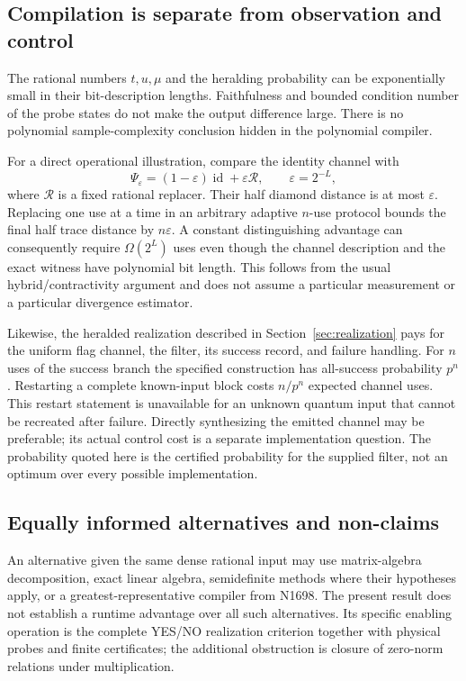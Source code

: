 \documentclass[11pt,a4paper]{article}
\theoremstyle{definition}\newtheorem{definition}[theorem]{Definition}
\newcommand{\id}{\operatorname{id}}
\begin{document}
\subsection{Compilation is separate from observation and control}

The rational numbers $t,u,\mu$ and the heralding probability can be exponentially small in their bit-description lengths. Faithfulness and bounded condition number of the probe states do not make the output difference large. There is no polynomial sample-complexity conclusion hidden in the polynomial compiler.

For a direct operational illustration, compare the identity channel with
\[
 \Psi_\varepsilon=(1-\varepsilon)\id+\varepsilon\mathcal R,
 \qquad \varepsilon=2^{-L},
\]
where $\mathcal R$ is a fixed rational replacer. Their half diamond distance is at most $\varepsilon$. Replacing one use at a time in an arbitrary adaptive $n$-use protocol bounds the final half trace distance by $n\varepsilon$. A constant distinguishing advantage can consequently require $\Omega(2^L)$ uses even though the channel description and the exact witness have polynomial bit length. This follows from the usual hybrid/contractivity argument and does not assume a particular measurement or a particular divergence estimator.

Likewise, the heralded realization described in Section~\ref{sec:realization} pays for the uniform flag channel, the filter, its success record, and failure handling. For $n$ uses of the success branch the specified construction has all-success probability $p^n$. Restarting a complete known-input block costs $n/p^n$ expected channel uses. This restart statement is unavailable for an unknown quantum input that cannot be recreated after failure. Directly synthesizing the emitted channel may be preferable; its actual control cost is a separate implementation question. The probability quoted here is the certified probability for the supplied filter, not an optimum over every possible implementation.

\subsection{Equally informed alternatives and non-claims}

An alternative given the same dense rational input may use matrix-algebra decomposition, exact linear algebra, semidefinite methods where their hypotheses apply, or a greatest-representative compiler from N1698. The present result does not establish a runtime advantage over all such alternatives. Its specific enabling operation is the complete YES/NO realization criterion together with physical probes and finite certificates; the additional obstruction is closure of zero-norm relations under multiplication.
\end{document}
